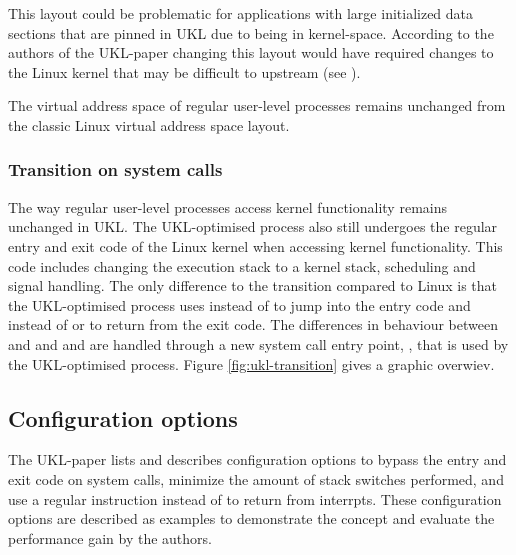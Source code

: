 \documentclass[10pt,twocolumn,a4paper]{article}
\begin{document}
      This layout could be problematic for applications with large initialized data sections
      that are pinned in UKL due to being in kernel-space.
      According to the authors of the UKL-paper changing this layout would have required changes
      to the Linux kernel that may be difficult to upstream (see ).

      The virtual address space of regular user-level processes remains unchanged from
      the classic Linux virtual address space layout.

    \subsubsection{Transition on system calls}\label{sec:transition}
      The way regular user-level processes access kernel functionality remains unchanged in UKL.
      The UKL-optimised process also still undergoes the regular entry and exit code of
      the Linux kernel when accessing kernel functionality.
      This code includes changing the execution stack to a kernel stack, scheduling and signal handling.
      The only difference to the transition compared to Linux is that the UKL-optimised process uses
       instead of  to jump into the entry code and  instead
      of  or  to return from the exit code. 
      The differences in behaviour between  and  and 
       and  are handled through a new system call entry point, 
      , that is used by the UKL-optimised process.
      Figure \ref{fig:ukl-transition} gives a graphic overwiev.

      \begin{figure*}[hbt]
        \centering
        
        \caption{Transition between applications and kernel in UKL base model}
        \label{fig:ukl-transition}
      \end{figure*}

  \subsection{Configuration options}
    The UKL-paper lists and describes configuration options to bypass the entry and exit code
    on system calls, minimize the amount of stack switches performed, and use a regular
     instruction instead of  to return from interrpts.
    These configuration options are described as examples to demonstrate the concept
    and evaluate the performance gain by the authors.
\end{document}
